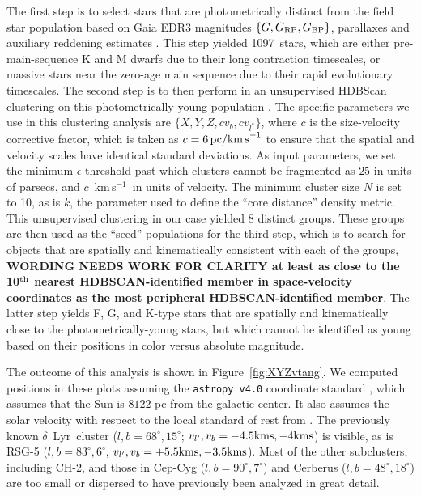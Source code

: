 \documentclass[12pt,twocolumn,linenumbers]{aastex63}
\newcommand{\npms}{1097} %
\newcommand{\kms}{\,km\,s$^{-1}$}
\begin{document}
The first step is to select stars that are photometrically distinct
from the field star population based on Gaia EDR3 magnitudes $\{G,
G_{\rm RP}, G_{\rm BP}\}$, parallaxes and auxiliary reddening
estimates \citep{lallement_gaia-2mass_2019}.  This step yielded \npms\
stars, which are either  pre-main-sequence K and M dwarfs due to their
long contraction timescales, or massive stars near the zero-age main
sequence due to their rapid evolutionary timescales.  The second step
is to then perform in an unsupervised HDBScan clustering on this
photometrically-young population
\citep{campello_hierarchical_2015,mcinnes_hdbscan_2017}.  The specific
parameters we use in this clustering analysis are $\{ X, Y, Z, c v_b,
c v_{l^*} \} $, where $c$ is the size-velocity corrective factor,
which is taken as $c=6\,{\rm pc / km\,s}^{-1}$ to ensure that the
spatial and velocity scales have identical standard deviations.  As
input parameters, we set the minimum $\epsilon$ threshold past which
clusters cannot be fragmented as $25$ in units of parsecs, and $c$
\kms\ in units of velocity.  The minimum cluster size $N$ is set to
10, as is $k$, the parameter used to define the ``core distance''
density metric.  This unsupervised clustering in our case
yielded 8 distinct groups.
These groups are then used as the ``seed'' populations for the third
step, which is to search for objects that are spatially and
kinematically consistent with each of the groups, {\bf WORDING NEEDS
WORK FOR CLARITY at least as close to the 10$^{\rm th}$ nearest HDBSCAN-identified
member in space-velocity coordinates as the most peripheral
HDBSCAN-identified member}.
The latter step yields F, G, and K-type stars that are spatially and
kinematically close to the photometrically-young stars, but which
cannot be identified as young based on their positions in color versus
absolute magnitude.

The outcome of this analysis is shown in Figure~\ref{fig:XYZvtang}.
We computed positions in these plots assuming the \texttt{astropy
v4.0} coordinate standard \citep{astropy_2018}, which assumes that the
Sun is $8122$ pc from the galactic center.  It also assumes
the solar velocity with respect to the local standard of rest from \citet{schonrich_local_2010}.
The previously known $\delta$~Lyr\ cluster ($l,b=68^\circ,15^\circ$;
$v_{l'}, v_b=-4.5{\rm kms},-4{\rm kms}$) is visible, as is
RSG-5 ($l,b=83^\circ,6^\circ$, $v_{l'}, v_b=+5.5{\rm kms},-3.5{\rm
kms}$).  Most of the other subclusters, including CH-2, and those in
Cep-Cyg ($l,b=90^\circ,7^\circ$) and Cerberus
($l,b=48^\circ,18^\circ$) are too small or dispersed to have
previously been analyzed in great detail.
\end{document}
